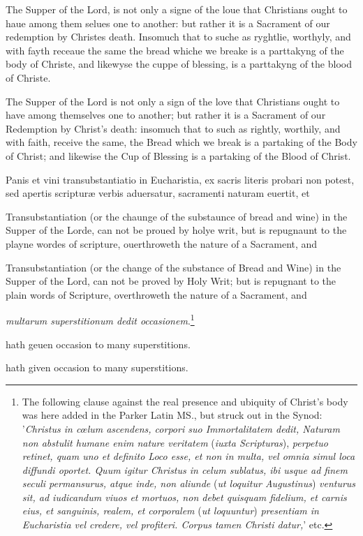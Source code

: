 The Supper of the Lord, is not only a signe of the loue that Christians ought to haue among them selues one to another: but rather it is a Sacrament of our redemption by Christes death. Insomuch that to suche as ryghtlie, worthyly, and with fayth receaue the same the bread whiche we breake is a parttakyng of the body of Christe, and likewyse the cuppe of blessing, is a parttakyng of the blood of Christe.

The Supper of the Lord is not only a sign of the love that Christians ought to have among themselves one to another; but rather it is a Sacrament of our Redemption by Christ's death: insomuch that to such as rightly, worthily, and with faith, receive the same, the Bread which we break is a partaking of the Body of Christ; and likewise the Cup of Blessing is a partaking of the Blood of Christ.

Panis et vini transubstantiatio in Eucharistia, ex sacris literis probari non potest, sed apertis scripturæ verbis aduersatur, sacramenti naturam euertit, et

Transubstantiation (or the chaunge of the substaunce of bread and wine) in the Supper of the Lorde, can not be proued by holye writ, but is repugnaunt to the playne wordes of scripture, ouerthroweth the nature of a Sacrament, and

Transubstantiation (or the change of the substance of Bread and Wine) in the Supper of the Lord, can not be proved by Holy Writ; but is repugnant to the plain words of Scripture, overthroweth the nature of a Sacrament, and

\emph{multarum superstitionum dedit occasionem}.\footnote{The following clause against the real presence and ubiquity of Christ's body was here added in the Parker Latin MS., but struck out in the Synod: '\emph{Christus in cœlum ascendens, corpori suo Immortalitatem dedit, Naturam non abstulit humane enim nature veritatem} (\emph{iuxta Scripturas}), \emph{perpetuo retinet, quam uno et definito Loco esse, et non in multa, vel omnia simul loca diffundi oportet. Quum igitur Christus in celum sublatus, ibi usque ad finem seculi permansurus, atque inde, non aliunde} (\emph{ut loquitur Augustinus}) \emph{venturus sit, ad iudicandum viuos et mortuos, non debet quisquam fidelium, et carnis eius, et sanguinis, realem, et corporalem} (\emph{ut loquuntur}) \emph{presentiam in Eucharistia vel credere, vel profiteri. Corpus tamen Christi datur,}' etc.}

hath geuen occasion to many superstitions.

hath given occasion to many superstitions.

